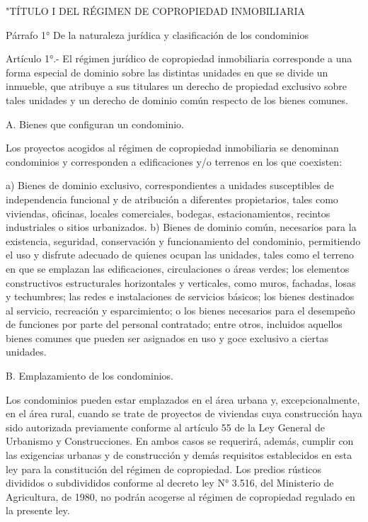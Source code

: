 "TÍTULO I
    DEL RÉGIMEN DE COPROPIEDAD INMOBILIARIA

     
    Párrafo 1°
    De la naturaleza jurídica y clasificación de los condominios

     
    Artículo 1°.- El régimen jurídico de copropiedad inmobiliaria corresponde a una forma especial de dominio sobre las distintas unidades en que se divide un inmueble, que atribuye a sus titulares un derecho de propiedad exclusivo sobre tales unidades y un derecho de dominio común respecto de los bienes comunes.
     
    A. Bienes que configuran un condominio.
     
    Los proyectos acogidos al régimen de copropiedad inmobiliaria se denominan condominios y corresponden a edificaciones y/o terrenos en los que coexisten:
     
    a) Bienes de dominio exclusivo, correspondientes a unidades susceptibles de independencia funcional y de atribución a diferentes propietarios, tales como viviendas, oficinas, locales comerciales, bodegas, estacionamientos, recintos industriales o sitios urbanizados.
    b) Bienes de dominio común, necesarios para la existencia, seguridad, conservación y funcionamiento del condominio, permitiendo el uso y disfrute adecuado de quienes ocupan las unidades, tales como el terreno en que se emplazan las edificaciones, circulaciones o áreas verdes; los elementos constructivos estructurales horizontales y verticales, como muros, fachadas, losas y techumbres; las redes e instalaciones de servicios básicos; los bienes destinados al servicio, recreación y esparcimiento; o los bienes necesarios para el desempeño de funciones por parte del personal contratado; entre otros, incluidos aquellos bienes comunes que pueden ser asignados en uso y goce exclusivo a ciertas unidades.
     
    B. Emplazamiento de los condominios.
     
    Los condominios pueden estar emplazados en el área urbana y, excepcionalmente, en el área rural, cuando se trate de proyectos de viviendas cuya construcción haya sido autorizada previamente conforme al artículo 55 de la Ley General de Urbanismo y Construcciones. En ambos casos se requerirá, además, cumplir con las exigencias urbanas y de construcción y demás requisitos establecidos en esta ley para la constitución del régimen de copropiedad.
    Los predios rústicos divididos o subdivididos conforme al decreto ley N° 3.516, del Ministerio de Agricultura, de 1980, no podrán acogerse al régimen de copropiedad regulado en la presente ley.
     
